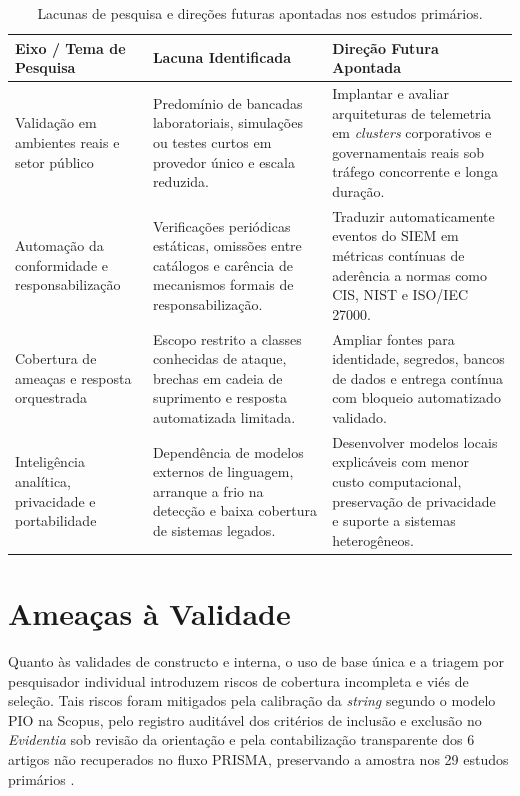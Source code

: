 \begin{table}[!htbp]
    \centering
    \caption{Lacunas de pesquisa e direções futuras apontadas nos estudos primários.}
    \label{tab:rsl_qs12}
    \footnotesize
    \begin{tabular}{p{3.3cm}p{4.7cm}p{6.0cm}}
        \hline
        \textbf{Eixo / Tema de Pesquisa} & \textbf{Lacuna Identificada} & \textbf{Direção Futura Apontada} \\ \hline
        Validação em ambientes reais e setor público & Predomínio de bancadas laboratoriais, simulações ou testes curtos em provedor único e escala reduzida. & Implantar e avaliar arquiteturas de telemetria em \textit{clusters} corporativos e governamentais reais sob tráfego concorrente e longa duração. \\ \hline
        Automação da conformidade e responsabilização & Verificações periódicas estáticas, omissões entre catálogos e carência de mecanismos formais de responsabilização. & Traduzir automaticamente eventos do SIEM em métricas contínuas de aderência a normas como CIS, NIST e ISO/IEC 27000. \\ \hline
        Cobertura de ameaças e resposta orquestrada & Escopo restrito a classes conhecidas de ataque, brechas em cadeia de suprimento e resposta automatizada limitada. & Ampliar fontes para identidade, segredos, bancos de dados e entrega contínua com bloqueio automatizado validado. \\ \hline
        Inteligência analítica, privacidade e portabilidade & Dependência de modelos externos de linguagem, arranque a frio na detecção e baixa cobertura de sistemas legados. & Desenvolver modelos locais explicáveis com menor custo computacional, preservação de privacidade e suporte a sistemas heterogêneos. \\ \hline
    \end{tabular}
\end{table}
\FloatBarrier

\section{Ameaças à Validade}
\label{sec:rsl_ameacas}

Quanto às validades de constructo e interna, o uso de base única e a triagem por pesquisador individual introduzem riscos de cobertura incompleta e viés de seleção. Tais riscos foram mitigados pela calibração da \textit{string} segundo o modelo PIO na Scopus, pelo registro auditável dos critérios de inclusão e exclusão no \textit{Evidentia} sob revisão da orientação e pela contabilização transparente dos 6 artigos não recuperados no fluxo PRISMA, preservando a amostra nos 29 estudos primários \cite{kitchenham2007}.

